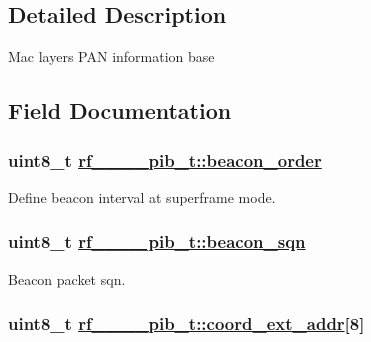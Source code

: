 \subsection{Detailed Description}
Mac layers PAN information base 



\subsection{Field Documentation}
\hypertarget{structrf__802__15__4__pib__t_9a5cae51885b5106357388a53dff4fd0}{
\subsubsection[beacon\_\-order]{\setlength{\rightskip}{0pt plus 5cm}uint8\_\-t \hyperlink{structrf__802__15__4__pib__t_9a5cae51885b5106357388a53dff4fd0}{rf\_\_\_\_\-pib\_\-t::beacon\_\-order}}}
\label{structrf__802__15__4__pib__t_9a5cae51885b5106357388a53dff4fd0}


Define beacon interval at superframe mode. \hypertarget{structrf__802__15__4__pib__t_766db8ff5040236ae2df52cb2c14cb0a}{
\subsubsection[beacon\_\-sqn]{\setlength{\rightskip}{0pt plus 5cm}uint8\_\-t \hyperlink{structrf__802__15__4__pib__t_766db8ff5040236ae2df52cb2c14cb0a}{rf\_\_\_\_\-pib\_\-t::beacon\_\-sqn}}}
\label{structrf__802__15__4__pib__t_766db8ff5040236ae2df52cb2c14cb0a}


Beacon packet sqn. \hypertarget{structrf__802__15__4__pib__t_7b60ab2c7b0a52c40f5dd366d9cae943}{
\subsubsection[coord\_\-ext\_\-addr]{\setlength{\rightskip}{0pt plus 5cm}uint8\_\-t \hyperlink{structrf__802__15__4__pib__t_7b60ab2c7b0a52c40f5dd366d9cae943}{rf\_\_\_\_\-pib\_\-t::coord\_\-ext\_\-addr}\mbox{[}8\mbox{]}}}
\label{structrf__802__15__4__pib__t_7b60ab2c7b0a52c40f5dd366d9cae943}


